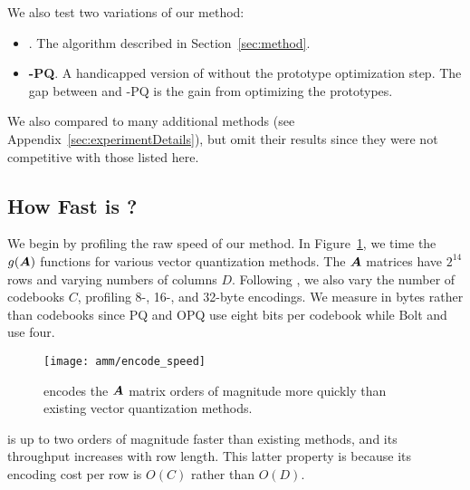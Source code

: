 \vspace{-2mm}
We also test two variations of our method:
\vspace{-2.5mm}
\begin{itemize}\itemsep0mm
    \item \textbf{\ours}. The algorithm described in Section~\ref{sec:method}.
    \item \textbf{\ours-PQ}. A handicapped version of \oursp without the prototype optimization step. The gap between \oursp and \ours-PQ is the gain from optimizing the prototypes.
\end{itemize}
\vspace{-2.5mm}
We also compared to many additional methods (see Appendix~\ref{sec:experimentDetails}), but omit their results since they were not competitive with those listed here.

\vspace{-1mm}
\subsection{How Fast is \ours?}
\vspace{-.5mm}

We begin by profiling the raw speed of our method. In Figure~\ref{fig:encodeSpeed}, we time the $g(\bm{A})$ functions for various vector quantization methods. The $\bm{A}$ matrices have $2^{14}$ rows and varying numbers of columns $D$. Following \citet{bolt}, we also vary the number of codebooks $C$, profiling 8-, 16-, and 32-byte encodings. We measure in bytes rather than codebooks since PQ and OPQ use eight bits per codebook while Bolt and \oursp use four.
\begin{figure}[h]
\begin{center}
\texttt{[image: amm/encode\_speed]}
\caption{\oursp encodes the $\bm{A}$ matrix orders of magnitude more quickly than existing vector quantization methods.}
\label{fig:encodeSpeed}
\end{center}
\end{figure}
\oursp is up to two orders of magnitude faster than existing methods, and its throughput increases with row length. This latter property is because its encoding cost per row is $O(C)$ rather than $O(D)$.


